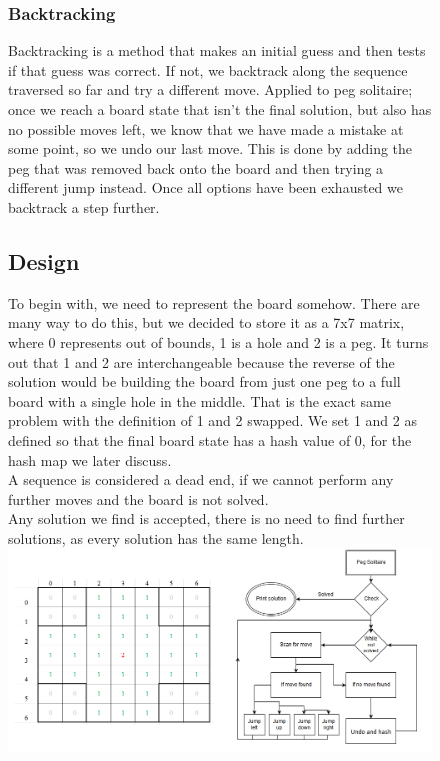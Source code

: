 \documentclass[11pt]{article}
\begin{document}
\begin{figure}

\subsubsection*{Backtracking}
Backtracking is a method that makes an initial guess and then tests if that guess was correct. If not, we backtrack along the sequence traversed so far and try a different move. 
Applied to peg solitaire; once we reach a board state that isn't the final solution, but also has no possible moves left, we know that we have made a mistake at some point, so we undo our last move. This is done by adding the peg that was removed back onto the board and then trying a different jump instead. Once all options have been exhausted we backtrack a step further.
\subsection{Design}
To begin with, we need to represent the board somehow. There are many way to do this, but we decided to store it as a 7x7 matrix, where 0 represents out of bounds, 1 is a hole and 2 is a peg. It turns out that 1 and 2 are interchangeable because the reverse of the solution would be building the board from just one peg to a full board with a single hole in the middle. That is the exact same problem with the definition of 1 and 2 swapped. We set 1 and 2 as defined so that the final board state has a hash value of 0, for the hash map we later discuss.\\
A sequence is considered a dead end, if we cannot perform any further moves and the board is not solved.\\
Any solution we find is accepted, there is no need to find further solutions, as every solution has the same length.\\\newline
\includegraphics[width=15cm]{6}

\end{figure}
\end{document}
